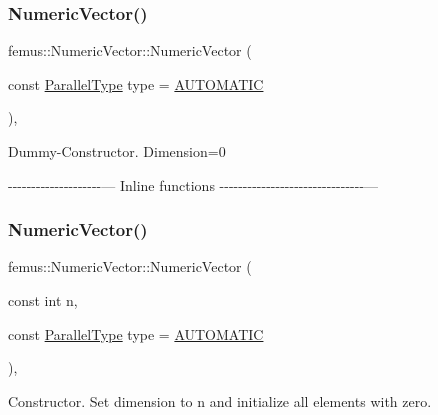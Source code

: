 \subsubsection{\texorpdfstring{Numeric\+Vector()}{NumericVector()}\hspace{0.1cm}{\footnotesize\ttfamily [1/4]}}
{\footnotesize\ttfamily femus\+::\+Numeric\+Vector\+::\+Numeric\+Vector (\begin{DoxyParamCaption}\item[{const \mbox{\hyperlink{_paralleltype_enum_8hpp_a55f694af2ca20b6481914237cf7e567c}{Parallel\+Type}}}]{type = {\ttfamily \mbox{\hyperlink{_paralleltype_enum_8hpp_a55f694af2ca20b6481914237cf7e567ca0a831c2bc18e8354fe3e30ec0f3cdcda}{A\+U\+T\+O\+M\+A\+T\+IC}}} }\end{DoxyParamCaption})\hspace{0.3cm}{\ttfamily [inline]}, {\ttfamily [explicit]}}

Dummy-\/\+Constructor. Dimension=0

-\/-\/-\/-\/-\/-\/-\/-\/-\/-\/-\/-\/-\/-\/-\/-\/-\/-\/-\/-\/--- Inline functions -\/-\/-\/-\/-\/-\/-\/-\/-\/-\/-\/-\/-\/-\/-\/-\/-\/-\/-\/-\/-\/-\/-\/-\/-\/-\/-\/-\/-\/-\/-\/--- \mbox{\label{classfemus_1_1_numeric_vector_a9a909487a5d6e1a71b6b753975d02230}} 
\subsubsection{\texorpdfstring{Numeric\+Vector()}{NumericVector()}\hspace{0.1cm}{\footnotesize\ttfamily [2/4]}}
{\footnotesize\ttfamily femus\+::\+Numeric\+Vector\+::\+Numeric\+Vector (\begin{DoxyParamCaption}\item[{const int}]{n,  }\item[{const \mbox{\hyperlink{_paralleltype_enum_8hpp_a55f694af2ca20b6481914237cf7e567c}{Parallel\+Type}}}]{type = {\ttfamily \mbox{\hyperlink{_paralleltype_enum_8hpp_a55f694af2ca20b6481914237cf7e567ca0a831c2bc18e8354fe3e30ec0f3cdcda}{A\+U\+T\+O\+M\+A\+T\+IC}}} }\end{DoxyParamCaption})\hspace{0.3cm}{\ttfamily [inline]}, {\ttfamily [explicit]}}

Constructor. Set dimension to {\ttfamily n} and initialize all elements with zero. \mbox{\label{classfemus_1_1_numeric_vector_a9a5466a53c14823beff01d3ac0ff95cf}} 
